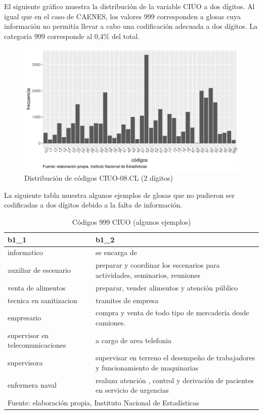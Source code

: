 \documentclass[
  12pt,
  spanish,
]{article}
\begin{document}
El siguiente gráfico muestra la distribución de la variable CIUO a dos
dígitos. Al igual que en el caso de CAENES, los valores 999 corresponden
a glosas cuya información no permitía llevar a cabo una codificación
adecuada a dos dígitos. La categoría 999 corresponde al 0,4\% del total.

\begin{figure}[H]
\centering
\large
\caption{Distribución de códigos CIUO-08.CL (2 dígitos)}
\label{distribucion_ciuo}
\includegraphics[width = \linewidth]{imagenes/distribucion_ciuo.pdf}
\normalsize
\end{figure}

La siguiente tabla muestra algunos ejemplos de glosas que no pudieron
ser codificadas a dos dígitos debido a la falta de información.

\begin{table}[H]

\caption{\label{tab:glosas 999 ciuo}\label{missing_ciuo_ejemplos}Códigos 999 CIUO (algunos ejemplos)}
\centering
\fontsize{9.5}{11.5}\selectfont
\begin{tabular}[t]{ll}
\toprule
b1\_1 & b1\_2\\
\midrule
informatico & se encarga de\\
auxiliar de escenario & preparar y coordinar los escenarios para actividades, seminarios, reuniones\\
venta de alimentos & preparar, vender alimentos y atención público\\
tecnica en sanitizacion & tramites de empresa\\
empresario & compra y venta de todo tipo de mercadería desde camiones.\\
\addlinespace
supervisor en telecomunicaciones & a cargo de  area telefonia\\
supervisora & supervisar en terreno el desempeño de trabajadores y funcionamiento de maquinarias\\
enfermera naval & realuza atención , control y derivación de pacientes en servicio de urgencias\\
\bottomrule
\multicolumn{2}{l}{\rule{0pt}{1em}Fuente: elaboración propia, Instituto Nacional de Estadísticas }\\
\end{tabular}
\end{table}
\end{document}
